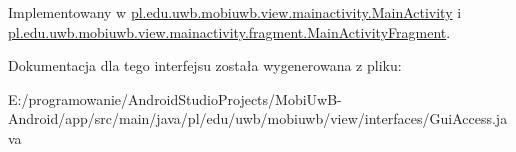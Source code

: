 Implementowany w \hyperlink{classpl_1_1edu_1_1uwb_1_1mobiuwb_1_1view_1_1mainactivity_1_1_main_activity_afee4f8823412ab040c537595564dd0be}{pl.\+edu.\+uwb.\+mobiuwb.\+view.\+mainactivity.\+Main\+Activity} i \hyperlink{classpl_1_1edu_1_1uwb_1_1mobiuwb_1_1view_1_1mainactivity_1_1fragment_1_1_main_activity_fragment_af733b5c03d85db55c450a668f0569b0b}{pl.\+edu.\+uwb.\+mobiuwb.\+view.\+mainactivity.\+fragment.\+Main\+Activity\+Fragment}.



Dokumentacja dla tego interfejsu została wygenerowana z pliku\+:\begin{DoxyCompactItemize}
\item 
E\+:/programowanie/\+Android\+Studio\+Projects/\+Mobi\+Uw\+B-\/\+Android/app/src/main/java/pl/edu/uwb/mobiuwb/view/interfaces/Gui\+Access.\+java\end{DoxyCompactItemize}
